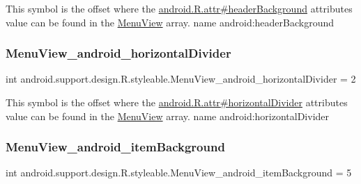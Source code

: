 This symbol is the offset where the \hyperlink{}{android.\+R.\+attr\#header\+Background} attribute\textquotesingle{}s value can be found in the \hyperlink{classandroid_1_1support_1_1design_1_1R_1_1styleable_acaf80b4eb554eab1b6f3b7f929ac7039}{Menu\+View} array.  name android\+:header\+Background \mbox{\label{classandroid_1_1support_1_1design_1_1R_1_1styleable_acd977854a2afdaf80b462337a6a55b96}} 
\subsubsection{\texorpdfstring{Menu\+View\+\_\+android\+\_\+horizontal\+Divider}{MenuView\_android\_horizontalDivider}}
{\footnotesize\ttfamily int android.\+support.\+design.\+R.\+styleable.\+Menu\+View\+\_\+android\+\_\+horizontal\+Divider = 2\hspace{0.3cm}{\ttfamily [static]}}

This symbol is the offset where the \hyperlink{}{android.\+R.\+attr\#horizontal\+Divider} attribute\textquotesingle{}s value can be found in the \hyperlink{classandroid_1_1support_1_1design_1_1R_1_1styleable_acaf80b4eb554eab1b6f3b7f929ac7039}{Menu\+View} array.  name android\+:horizontal\+Divider \mbox{\label{classandroid_1_1support_1_1design_1_1R_1_1styleable_a1ec0468c04c0d2612a6212d4448d2ad6}} 
\subsubsection{\texorpdfstring{Menu\+View\+\_\+android\+\_\+item\+Background}{MenuView\_android\_itemBackground}}
{\footnotesize\ttfamily int android.\+support.\+design.\+R.\+styleable.\+Menu\+View\+\_\+android\+\_\+item\+Background = 5\hspace{0.3cm}{\ttfamily [static]}}

